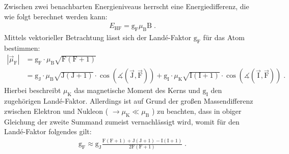 \FloatBarrier
Zwischen zwei benachbarten Energieniveaus herrscht eine Energiedifferenz, die wie folgt berechnet werden kann:
\begin{align*}
    E_{\text{HF}} = \text{g}_{\text{F}} \mu_{\text{B}} \text{B} \; .
\end{align*}
Mittels vektorieller Betrachtung lässt sich der Landé-Faktor $\text{g}_{\text{F}}$ für das Atom bestimmen:
\begin{align*}
    |\vec{\mu}_{\text{F}}| &= \text{g}_{\text{F}} \cdot \mu_{\text{B}} \sqrt{\text{F} (\text{F}+1)} \\
    &=\text{g}_{\text{J}} \cdot \mu_{\text{B}} \sqrt{\text{J} (\text{J} + 1)} \cdot \cos\left(\measuredangle(\vec{\text{J}},\vec{\text{F}})\right) +
    \text{g}_{\text{I}} \cdot \mu_{\text{K}} \sqrt{ \text{I}(\text{I}+1) } \cdot \cos\left(\measuredangle(\vec{\text{I}},\vec{\text{F}})\right) \; .
\end{align*}
Hierbei beschreibt $\mu_{\text{K}}$ das magnetische Moment des Kerns und $\text{g}_{\text{I}}$ den zugehörigen Landé-Faktor.
Allerdings ist auf Grund der großen Massendifferenz zwischen Elektron und Nukleon ( $\rightarrow \mu_{\text{K}} \ll \mu_{\text{B}} $ ) zu beachten, dass in obiger Gleichung der zweite Summand zumeist vernachlässigt wird, womit für den Landé-Faktor folgendes gilt:
\begin{align}
    \text{g}_{\text{F}} \approx \text{g}_{\text{J}} \frac{\text{F} (\text{F} + 1)+\text{J} (\text{J} + 1) - \text{I}(\text{I} + 1)}{2\text{F}(\text{F}+1)} \; .
	\label{eq:La-Fa.gf}
\end{align}


